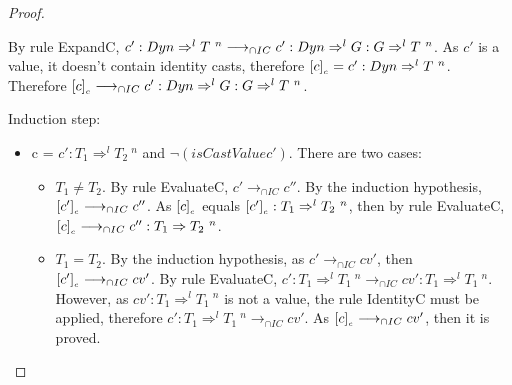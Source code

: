 \documentclass[a4paper]{article}
\begin{document}
\begin{proof}
\begin{itemize}
    By rule ExpandC, $c' : Dyn \Rightarrow^l T\ ^n \longrightarrow_{\cap IC} c' : Dyn \Rightarrow^l G : G \Rightarrow^l T\ ^n$.
    As $c'$ is a value, it doesn't contain identity casts, therefore $[c]_{_c} = c' : Dyn \Rightarrow^l T\ ^n$.
    Therefore $[c]_{_c} \longrightarrow_{\cap IC} c' : Dyn \Rightarrow^l G : G \Rightarrow^l T\ ^n$.
    \begin{comment}
    \item c = $c' : T_1 \Rightarrow^l T_2\ ^n$ and $isCastValue1\ c'\ \lor\ isEmptyCast\ c'$ and $initialType(c') = T_I$.
    By rule TriggerStuckC, $c' : T_1 \Rightarrow^l T_2\ ^n \longrightarrow_{\cap IC} \stuckcast{T_I}{T_2}{n}$.
    As $T_1 \neq T_2$ and $c'$ is a value, then $\erasec{c} = c' : T_1 \Rightarrow^l T_2\ ^n$.
    Therefore, $\erasec{c} \longrightarrow_{\cap IC} \stuckcast{T_I}{T_2}{n}$.
    \end{comment}
\end{itemize}
Induction step:
\begin{itemize}
    \item c = $c' : T_1 \Rightarrow^l T_2\ ^{n}$ and $\neg(isCastValue c')$.
    There are two cases:
    \begin{itemize}
        \item $T_1 \neq T_2$.
        By rule EvaluateC, $c' \longrightarrow_{\cap IC} c''$.
        By the induction hypothesis, $[c']_{_c} \longrightarrow_{\cap IC} c''$.
        As $[c]_{_c}$ equals $[c']_{_c} : T_1 \Rightarrow^l T_2\ ^n$, then by rule EvaluateC, $\erasec{c} \longrightarrow_{\cap IC} c'' : T_1 \Rightarrow T_2\ ^n$.
        \item $T_1 = T_2$.
        By the induction hypothesis, as $c' \longrightarrow_{\cap IC} cv'$, then $[c']_{_c} \longrightarrow_{\cap IC} cv'$.
        By rule EvaluateC, $c' : T_1 \Rightarrow^l T_1\ ^n \longrightarrow_{\cap IC} cv' : T_1 \Rightarrow^l T_1\ ^n$.
        However, as $cv' : T_1 \Rightarrow^l T_1\ ^n$ is not a value, the rule IdentityC must be applied, therefore $c' : T_1 \Rightarrow^l T_1\ ^n \longrightarrow_{\cap IC} cv'$.
        As $[c]_{_c} \longrightarrow_{\cap IC} cv'$, then it is proved.
    \end{itemize}
\end{itemize}
\end{proof}
\end{document}
